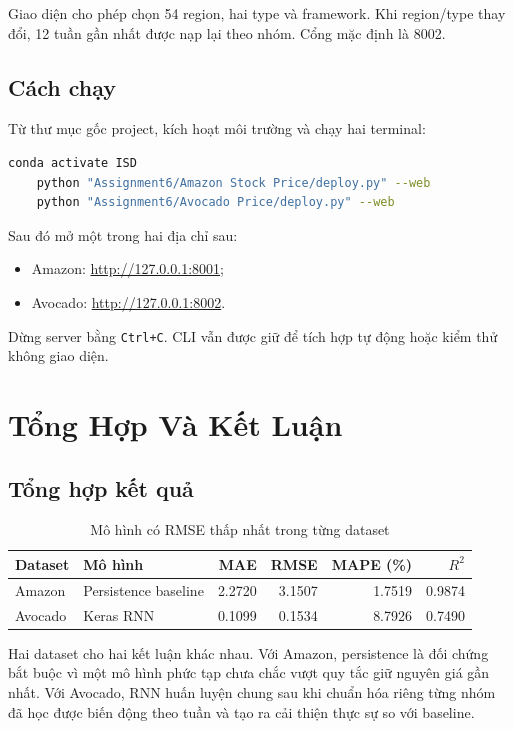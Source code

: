 \documentclass[12pt,a4paper]{report}
\newcommand{\codeinline}[1]{\texttt{#1}}
\begin{document}
Giao diện cho phép chọn 54 region, hai type và framework. Khi region/type thay đổi, 12 tuần gần nhất
được nạp lại theo nhóm. Cổng mặc định là 8002.

\section{Cách chạy}
Từ thư mục gốc project, kích hoạt môi trường và chạy hai terminal:
\begin{lstlisting}[language=bash,caption={Khởi động hai web deploy trên localhost}]
conda activate ISD
    python "Assignment6/Amazon Stock Price/deploy.py" --web
    python "Assignment6/Avocado Price/deploy.py" --web
\end{lstlisting}
Sau đó mở một trong hai địa chỉ sau:
\begin{itemize}
    \item Amazon: \url{http://127.0.0.1:8001};
    \item Avocado: \url{http://127.0.0.1:8002}.
\end{itemize}
Dừng server bằng \codeinline{Ctrl+C}. CLI vẫn được giữ để tích hợp tự động hoặc kiểm thử không giao diện.

\chapter{Tổng Hợp Và Kết Luận}

\section{Tổng hợp kết quả}
\begin{table}[H]
\centering
\caption{Mô hình có RMSE thấp nhất trong từng dataset}
\label{tab:master_summary}
\begin{tabular}{llrrrr}
\toprule
\textbf{Dataset} & \textbf{Mô hình} & \textbf{MAE} & \textbf{RMSE} & \textbf{MAPE (\%)} & \textbf{$R^2$} \\
\midrule
Amazon & Persistence baseline & 2.2720 & 3.1507 & 1.7519 & 0.9874 \\
Avocado & Keras RNN & 0.1099 & 0.1534 & 8.7926 & 0.7490 \\
\bottomrule
\end{tabular}
\end{table}

Hai dataset cho hai kết luận khác nhau. Với Amazon, persistence là đối chứng bắt buộc vì một mô hình phức
tạp chưa chắc vượt quy tắc giữ nguyên giá gần nhất. Với Avocado, RNN huấn luyện chung sau khi chuẩn hóa
riêng từng nhóm đã học được biến động theo tuần và tạo ra cải thiện thực sự so với baseline.
\end{document}
